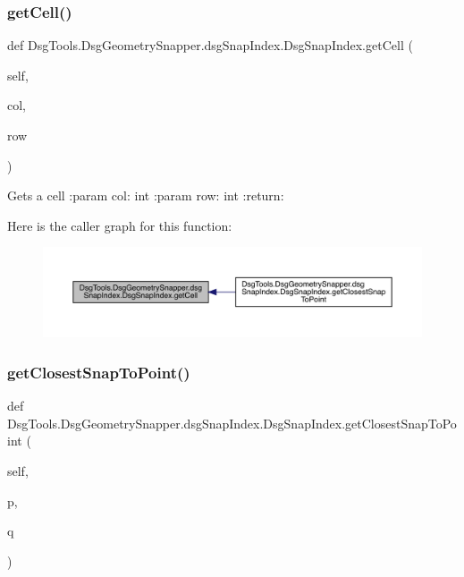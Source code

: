 \subsubsection{\texorpdfstring{get\+Cell()}{getCell()}}
{\footnotesize\ttfamily def Dsg\+Tools.\+Dsg\+Geometry\+Snapper.\+dsg\+Snap\+Index.\+Dsg\+Snap\+Index.\+get\+Cell (\begin{DoxyParamCaption}\item[{}]{self,  }\item[{}]{col,  }\item[{}]{row }\end{DoxyParamCaption})}

\begin{DoxyVerb}Gets a cell
:param col: int
:param row: int
:return:
\end{DoxyVerb}
 Here is the caller graph for this function\+:
\nopagebreak
\begin{figure}[H]
\begin{center}
\leavevmode
\includegraphics[width=350pt]{class_dsg_tools_1_1_dsg_geometry_snapper_1_1dsg_snap_index_1_1_dsg_snap_index_ad42dd41c1bdfc6bdfd6a0965601f9752_icgraph}
\end{center}
\end{figure}
\mbox{\label{class_dsg_tools_1_1_dsg_geometry_snapper_1_1dsg_snap_index_1_1_dsg_snap_index_a98c7217540299dec84c5613c06143167}} 
\subsubsection{\texorpdfstring{get\+Closest\+Snap\+To\+Point()}{getClosestSnapToPoint()}}
{\footnotesize\ttfamily def Dsg\+Tools.\+Dsg\+Geometry\+Snapper.\+dsg\+Snap\+Index.\+Dsg\+Snap\+Index.\+get\+Closest\+Snap\+To\+Point (\begin{DoxyParamCaption}\item[{}]{self,  }\item[{}]{p,  }\item[{}]{q }\end{DoxyParamCaption})}


